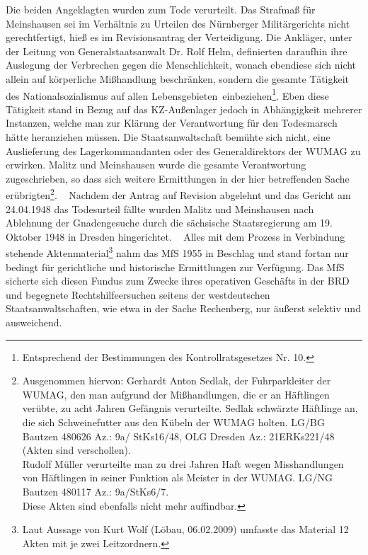 \documentclass[a4paper,12pt,ngerman,
]{nisebook}
\begin{document}
Die beiden Angeklagten wurden zum Tode verurteilt. \glqq Das Strafmaß für Meinshausen sei im Verhältnis zu Urteilen des Nürnberger Militärgerichts nicht gerechtfertigt\grqq, hieß es im Revisionsantrag der Verteidigung. Die Ankläger, unter der Leitung von Generalstaatsanwalt Dr. Rolf Helm, definierten daraufhin ihre Auslegung der \glqq Verbrechen gegen die Menschlichkeit\grqq, wonach ebendiese sich nicht allein auf körperliche Mißhandlung beschränken, sondern \glqq die gesamte Tätigkeit des Nationalsozialismus auf allen Lebensgebieten\grqq~einbeziehen\footnote{Entsprechend der Bestimmungen des Kontrollratsgesetzes Nr. 10.}.
Eben diese Tätigkeit stand in Bezug auf das KZ-Außenlager jedoch in Abhängigkeit mehrerer Instanzen, welche man zur Klärung der Verantwortung für den Todesmarsch hätte heranziehen müssen. Die Staatsanwaltschaft bemühte sich nicht, eine Auslieferung des Lagerkommandanten oder des Generaldirektors der WUMAG zu erwirken. Malitz und Meinshausen wurde die gesamte Verantwortung zugeschrieben, so dass sich weitere Ermittlungen in der hier betreffenden Sache erübrigten\footnote{Ausgenommen hiervon: Gerhardt Anton Sedlak, der Fuhrparkleiter der WUMAG, den man aufgrund der Mißhandlungen, die er an Häftlingen verübte, zu acht Jahren Gefängnis verurteilte. Sedlak schwärzte Häftlinge an, die sich Schweinefutter aus den Kübeln der WUMAG holten. LG/BG Bautzen 480626 Az.: 9a/ StKs16/48, OLG Dresden Az.: 21ERKs221/48 (Akten sind verschollen). \\ Rudolf Müller verurteilte man zu drei Jahren Haft wegen Misshandlungen von Häftlingen in seiner Funktion als Meister in der WUMAG. LG/NG Bautzen 480117 Az.: 9a/StKs6/7. \\
Diese Akten sind ebenfalls nicht mehr auffindbar.}.
~\newline
Nachdem der Antrag auf Revision abgelehnt und das Gericht am 24.04.1948 das Todesurteil fällte wurden Malitz und Meinshausen nach Ablehnung der Gnadengesuche durch die sächsische Staatsregierung am 19. Oktober 1948 in Dresden hingerichtet. 
~\newline
Alles mit dem Prozess in Verbindung stehende Aktenmaterial\footnote{Laut Aussage von Kurt Wolf (Löbau, 06.02.2009) umfasste das Material 12 Akten mit je zwei Leitzordnern.} nahm das MfS 1955 in Beschlag und stand fortan nur bedingt für gerichtliche und historische Ermittlungen zur Verfügung.
Das MfS sicherte sich diesen Fundus zum Zwecke ihres operativen Geschäfts in der BRD und begegnete Rechtshilfeersuchen seitens der westdeutschen Staatsanwaltschaften, wie etwa in der Sache Rechenberg, nur äußerst selektiv und ausweichend.
\end{document}
